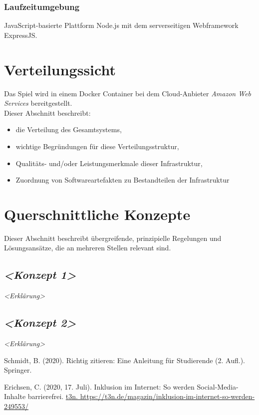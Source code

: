 \documentclass[letterpaper, 10 pt, conference]{ieeeconf}
\begin{document}
\subsubsection{Laufzeitumgebung}

JavaScript-basierte Plattform Node.js mit dem serverseitigen Webframework ExpressJS.

\section{Verteilungssicht}
Das Spiel wird in einem Docker Container bei dem Cloud-Anbieter \textit{Amazon Web Services} bereitgestellt. \\

Dieser Abschnitt beschreibt:
\begin{itemize}
\item
  die Verteilung des Gesamtsystems,
\item
  wichtige Begründungen für diese Verteilungsstruktur,
\item
  Qualitäts- und/oder Leistungsmerkmale dieser Infrastruktur,
\item
  Zuordnung von Softwareartefakten zu Bestandteilen der Infrastruktur
\end{itemize}

\section{Querschnittliche Konzepte}

Dieser Abschnitt beschreibt übergreifende, prinzipielle Regelungen und
Lösungsansätze, die an mehreren Stellen relevant sind.

\subsection{\texorpdfstring{\emph{\textless Konzept
1\textgreater{}}}{\textless Konzept 1\textgreater{}}}

\emph{\textless Erklärung\textgreater{}}

\subsection{\texorpdfstring{\emph{\textless Konzept
2\textgreater{}}}{\textless Konzept 2\textgreater{}}}

\emph{\textless Erklärung\textgreater{}}

\begin{thebibliography}{99}

 Schmidt, B. (2020). Richtig zitieren: Eine Anleitung für Studierende (2. Aufl.). Springer.

 Erichsen, C. (2020, 17. Juli). Inklusion im Internet: So werden Social-Media-Inhalte barrierefrei. \url{t3n. https://t3n.de/magazin/inklusion-im-internet-so-werden-249553/}

\end{thebibliography}


\addtolength{\textheight}{-12cm}
\end{document}
